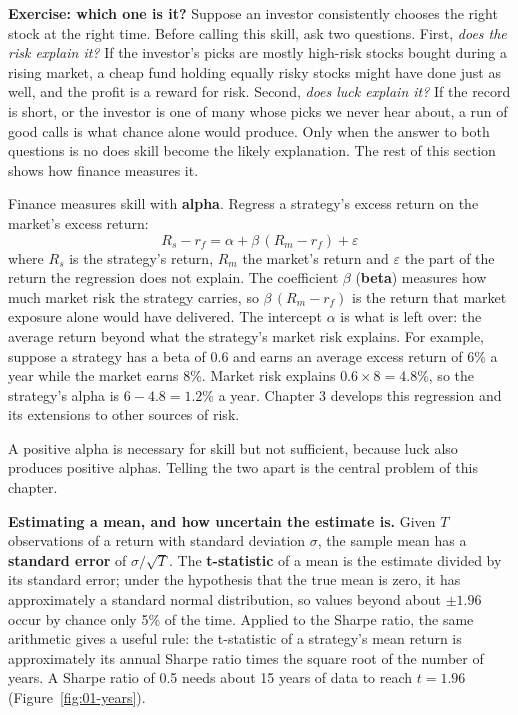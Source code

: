 \noindent\textbf{Exercise: which one is it?} Suppose an investor
consistently chooses the right stock at the right time. Before calling this
skill, ask two questions. First, \emph{does the risk explain it?} If the
investor's picks are mostly high-risk stocks bought during a rising market,
a cheap fund holding equally risky stocks might have done just as well, and
the profit is a reward for risk. Second, \emph{does luck explain it?} If the
record is short, or the investor is one of many whose picks we never hear
about, a run of good calls is what chance alone would produce. Only when the
answer to both questions is no does skill become the likely explanation. The
rest of this section shows how finance measures it.

Finance measures skill with \textbf{alpha}. Regress a strategy's excess return on the market's excess return:
\begin{equation}
  R_s - r_f = \alpha + \beta\,(R_m - r_f) + \varepsilon \nonumber
\end{equation}
where $R_s$ is the strategy's return, $R_m$ the market's return and $\varepsilon$ the part of the return the regression does not explain. The coefficient $\beta$ (\textbf{beta}) measures how much market risk the strategy carries, so $\beta\,(R_m - r_f)$ is the return that market exposure alone would have delivered. The intercept $\alpha$ is what is left over: the average return beyond what the strategy's market risk explains. For example, suppose a strategy has a beta of 0.6 and earns an average excess return of 6\% a year while the market earns 8\%. Market risk explains $0.6 \times 8 = 4.8$\%, so the strategy's alpha is $6 - 4.8 = 1.2$\% a year. Chapter 3 develops this regression and its extensions to other sources of risk.

A positive alpha is necessary for skill but not sufficient, because luck also produces positive alphas. Telling the two apart is the central problem of this chapter.

\textbf{Estimating a mean, and how uncertain the estimate is.} Given $T$ observations of a return with standard deviation $\sigma$, the sample mean has a \textbf{standard error} of $\sigma/\sqrt{T}$. The \textbf{t-statistic} of a mean is the estimate divided by its standard error; under the hypothesis that the true mean is zero, it has approximately a standard normal distribution, so values beyond about $\pm 1.96$ occur by chance only 5\% of the time. Applied to the Sharpe ratio, the same arithmetic gives a useful rule: the t-statistic of a strategy's mean return is approximately its annual Sharpe ratio times the square root of the number of years. A Sharpe ratio of 0.5 needs about 15 years of data to reach $t = 1.96$ (Figure~\ref{fig:01-years}).


